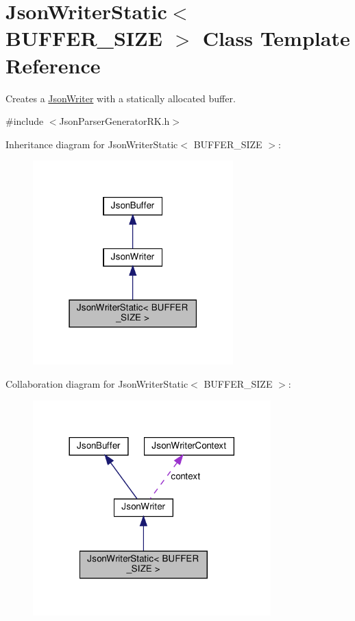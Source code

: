 \hypertarget{class_json_writer_static}{}\section{Json\+Writer\+Static$<$ B\+U\+F\+F\+E\+R\+\_\+\+S\+I\+ZE $>$ Class Template Reference}
\label{class_json_writer_static}


Creates a \hyperlink{class_json_writer}{Json\+Writer} with a statically allocated buffer.  




{\ttfamily \#include $<$Json\+Parser\+Generator\+R\+K.\+h$>$}



Inheritance diagram for Json\+Writer\+Static$<$ B\+U\+F\+F\+E\+R\+\_\+\+S\+I\+ZE $>$\+:
\nopagebreak
\begin{figure}[H]
\begin{center}
\leavevmode
\includegraphics[width=219pt]{class_json_writer_static__inherit__graph}
\end{center}
\end{figure}


Collaboration diagram for Json\+Writer\+Static$<$ B\+U\+F\+F\+E\+R\+\_\+\+S\+I\+ZE $>$\+:
\nopagebreak
\begin{figure}[H]
\begin{center}
\leavevmode
\includegraphics[width=260pt]{class_json_writer_static__coll__graph}
\end{center}
\end{figure}
